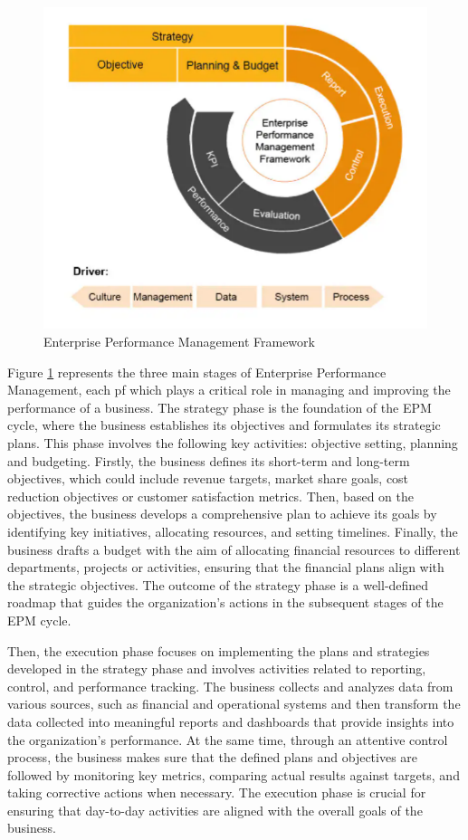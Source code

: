 \documentclass[12pt,a4paper,openright,twoside]{book}
\begin{document}
\begin{figure}[htbp]
	\centering
	\includegraphics[]{figures/cycle.pdf}
	\caption{Enterprise Performance Management Framework}
	\label{fig:cycle}
\end{figure}

Figure \ref{fig:cycle} represents the three main stages of Enterprise Performance Management, each pf which plays a critical role in managing and improving the performance of a business. 
%
The strategy phase is the foundation of the EPM cycle, where the business establishes its objectives and formulates its strategic plans. 
%
This phase involves the following key activities: objective setting, planning and budgeting.
%
Firstly, the business defines its short-term and long-term objectives, which could include revenue targets, market share goals, cost reduction objectives or customer satisfaction metrics.
%
Then, based on the objectives, the business develops a comprehensive plan to achieve its goals by identifying key initiatives, allocating resources, and setting timelines.
%
Finally, the business drafts a budget with the aim of allocating financial resources to different departments, projects or activities, ensuring that the financial plans align with the strategic objectives.
%
The outcome of the strategy phase is a well-defined roadmap that guides the organization's actions in the subsequent stages of the EPM cycle.

Then, the execution phase focuses on implementing the plans and strategies developed in the strategy phase and involves activities related to reporting, control, and performance tracking.
%
The business collects and analyzes data from various sources, such as financial and operational systems and then transform the data collected into meaningful reports and dashboards that provide insights into the organization's performance.
%
At the same time, through an attentive control process, the business makes sure that the defined plans and objectives are followed by monitoring key metrics, comparing actual results against targets, and taking corrective actions when necessary.
%
The execution phase is crucial for ensuring that day-to-day activities are aligned with the overall goals of the business.
\end{document}
